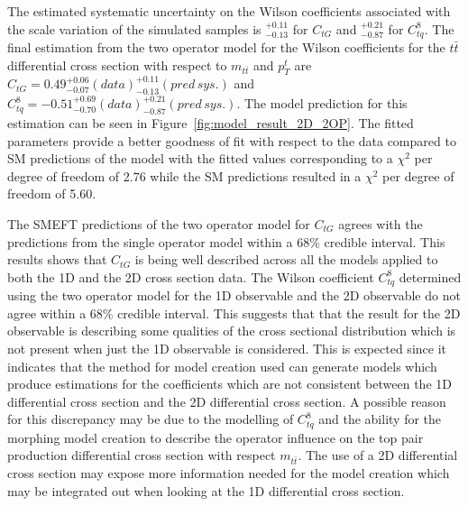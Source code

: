 \documentclass[a4paper,11pt]{article}
\begin{document}
The estimated systematic uncertainty on the Wilson coefficients associated with the scale variation of the simulated samples is $^{+0.11}_{-0.13}$ for $C_{tG}$ and $^{+0.21}_{-0.87}$ for $C_{tq}^{8}$.
The final estimation from the two operator model for the Wilson coefficients for the $t\bar{t}$ differential cross section with respect to $m_{t\bar{t}}$ and $p_{T}^{t}$ are $C_{tG} = 0.49_{-0.07}^{+0.06}(data) ^{+0.11}_{-0.13} (pred\,sys.)$ and $C_{tq}^{8}=-0.51_{-0.70}^{+0.69} (data) ^{+0.21}_{-0.87} (pred\,sys.)$.
The model prediction for this estimation can be seen in Figure~\ref{fig:model_result_2D_2OP}.
The fitted parameters provide a better goodness of fit with respect to the data compared to SM predictions of the model with the fitted values corresponding to a $\chi^{2}$ per degree of freedom of 2.76 while the SM predictions resulted in a $\chi^{2}$ per degree of freedom of 5.60.

The SMEFT predictions of the two operator model for $C_{tG}$ agrees with the predictions from the single operator model within a 68\% credible interval.
This results shows that $C_{tG}$ is being well described across all the models applied to both the 1D and the 2D cross section data.
The Wilson coefficient $C_{tq}^{8}$ determined using the two operator model for the 1D observable and the 2D observable do not agree within a 68\% credible interval.
This suggests that that the result for the 2D observable is describing some qualities of the cross sectional distribution which is not present when just the 1D observable is considered.
This is expected since it indicates that the method for model creation used can generate models which produce estimations for the coefficients which are not consistent between the 1D differential cross section and the 2D differential cross section.
A possible reason for this discrepancy may be due to the modelling of $C_{tq}^{8}$ and the ability for the morphing model creation to describe the operator influence on the top pair production differential cross section with respect $m_{t\bar{t}}$.
The use of a 2D differential cross section may expose more information needed for the model creation which may be integrated out when looking at the 1D differential cross section.
\end{document}
